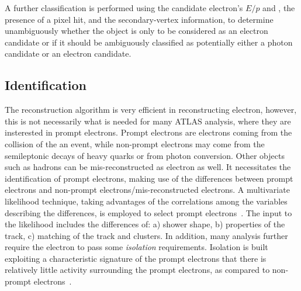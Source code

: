 A further classification is performed using the candidate electron’s $E/p$ and \pt, 
the presence of a pixel hit, and the secondary-vertex information, to determine
unambiguously whether the object is only to be considered as an electron candidate or if it should be
ambiguously classified as potentially either a photon candidate or an electron candidate.

\subsection{Identification} 
The reconstruction algorithm is very efficient in reconstructing electron,
however, this is not necessarily what is needed for many ATLAS analysis, where
they are insterested in prompt electrons. 
Prompt electrons are electrons coming from the collision of the an event, 
while non-prompt electrons may come from
the semileptonic decays of heavy quarks or from photon conversion.
Other objects such as hadrons can be mis-reconstructed as electron as well.
It necessitates the identification of prompt electrons, making use of the 
differences between prompt electrons and non-prompt electrons/mis-reconstructed electrons.
A multivariate likelihood technique, taking advantages of the correlations
among the variables describing the differences,
is employed to select prompt electrons~\cite{PERF-2017-01}.
The input to the likelihood includes the differences of: 
a) shower shape, b) properties of the track, c) matching
of the track and clusters.
In addition, many analysis further require the electron to pass
some \textit{isolation} requirements.
Isolation is built exploiting a characteristic signature 
of the prompt electrons that 
there is relatively little activity surrounding 
the prompt electrons, as compared to non-prompt electrons~\cite{EGAM-2018-01}. 

